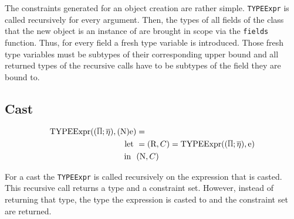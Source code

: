 The constraints generated for an object creation are rather simple. \verb|TYPEExpr| is called recursively for every argument. Then, the types of all
fields of the class that the new object is an instance of are brought in scope via the \verb|fields| function. Thus, for every field a fresh type variable is introduced.
Those fresh type variables must be subtypes of their corresponding upper bound and all returned types of the recursive calls have to be subtypes of the field they are bound to.

\subsection{Cast}

\begin{align*}
    \texpr{(\text{N})\text{e}} &=\\
    \text{let} \ &= (\text{R}, C) = \texpr{\text{e}}\\
    \text{in} \ \ &(\text{N}, C)
\end{align*}

For a cast the \verb|TYPEExpr| is called recursively on the expression that is casted. This recursive call returns a type and a constraint set. However, instead of returning that type, the type the expression is casted to and the constraint set are returned.
